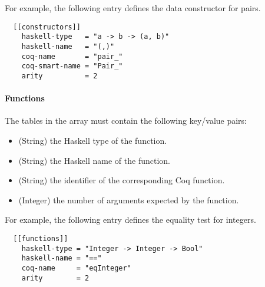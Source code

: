 For example, the following entry defines the data constructor for pairs.
\begin{verbatim}
  [[constructors]]
    haskell-type   = "a -> b -> (a, b)"
    haskell-name   = "(,)"
    coq-name       = "pair_"
    coq-smart-name = "Pair_"
    arity          = 2
\end{verbatim}

\paragraph{Functions}
The tables in the  array must contain the following
key/value pairs:
\begin{itemize}
  \item {} (String) the Haskell type of the function.
  \item {} (String) the Haskell name of the function.
  \item {} (String) the identifier of the corresponding Coq function.
  \item {} (Integer) the number of arguments expected by the function.
\end{itemize}

For example, the following entry defines the equality test for integers.
\begin{verbatim}
  [[functions]]
    haskell-type = "Integer -> Integer -> Bool"
    haskell-name = "=="
    coq-name     = "eqInteger"
    arity        = 2
\end{verbatim}
